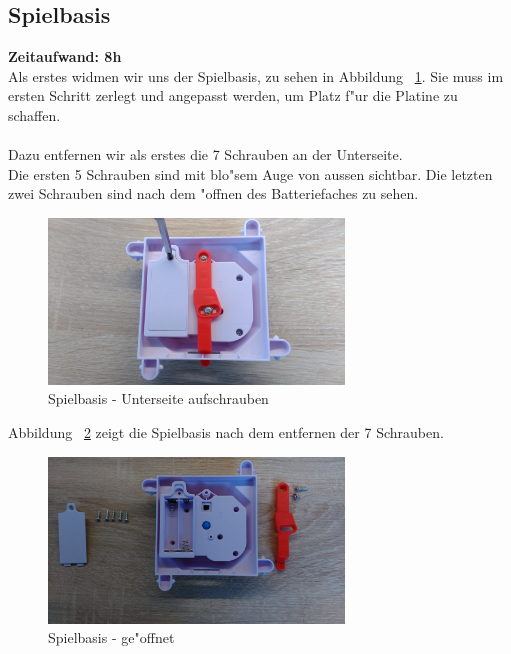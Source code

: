 \subsection{Spielbasis}

\textbf{Zeitaufwand: 8h} \\


Als erstes widmen wir uns der Spielbasis, zu sehen in Abbildung ~\ref{fig2}. Sie muss im ersten Schritt zerlegt und angepasst werden, um Platz f"ur die Platine zu schaffen. \\
\\
Dazu entfernen wir als erstes die 7 Schrauben an der Unterseite. \\
Die ersten 5 Schrauben sind mit blo"sem Auge von aussen sichtbar. Die letzten zwei Schrauben sind nach dem "offnen des Batteriefaches zu sehen.  

\vspace{0.5cm}
\begin{figure}[!ht]
	\centering
  	\includegraphics[width=0.7\textwidth]{pictures/loolou_002.jpg}
	\caption{Spielbasis - Unterseite aufschrauben}
	\label{fig2}
\end{figure}
\vspace{0.5cm}

Abbildung ~\ref{fig3} zeigt die Spielbasis nach dem entfernen der 7 Schrauben. 

\vspace{0.5cm}
\begin{figure}[!ht]
	\centering
  	\includegraphics[width=0.7\textwidth]{pictures/loolou_003.jpg}
	\caption{Spielbasis - ge"offnet}
	\label{fig3}
\end{figure}
\vspace{0.5cm}


